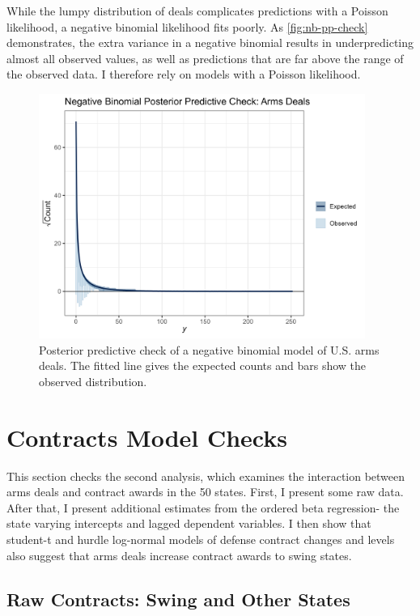 \documentclass[12pt]{article}
\begin{document}
While the lumpy distribution of deals complicates predictions with a Poisson likelihood, a negative binomial likelihood fits poorly. 
As \autoref{fig:nb-pp-check} demonstrates, the extra variance in a negative binomial results in underpredicting almost all observed values, as well as predictions that are far above the range of the observed data. 
I therefore rely on models with a Poisson likelihood. 


\begin{figure}[htpb]
	\centering
		\includegraphics[width=0.95\textwidth]{nb-pp-check.png}
	\caption{Posterior predictive check of a negative binomial model of U.S. arms deals. The fitted line gives the expected counts and bars show the observed distribution.}
	\label{fig:nb-pp-check}
\end{figure}

\newpage

\section{Contracts Model Checks} 

This section checks the second analysis, which examines the interaction between arms deals and contract awards in the 50 states. 
First, I present some raw data. 
After that, I present additional estimates from the ordered beta regression- the state varying intercepts and lagged dependent variables. 
I then show that student-t and hurdle log-normal models of defense contract changes and levels also suggest that arms deals increase contract awards to swing states. 

\subsection{Raw Contracts: Swing and Other States}
\end{document}

